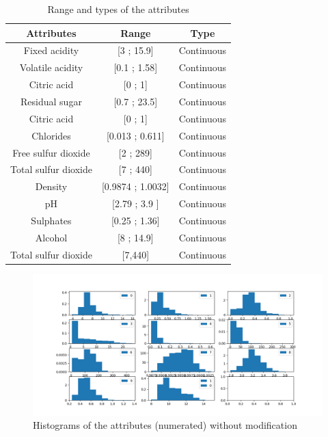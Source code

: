 \documentclass[twoside,a4paper,12pt]{report}
\begin{document}
\begin{table}
\centering
 \begin{tabular}{||c c c||} 
 \hline \hline
 Attributes & Range & Type\\ 
 \hline\hline
 Fixed acidity & [3 ; 15.9] & Continuous\\ 
 \hline
 Volatile acidity & [0.1 ; 1.58] & Continuous\\
 \hline
 Citric acid & [0 ; 1] & Continuous \\
  \hline
 Residual sugar & [0.7 ; 23.5] & Continuous \\
  \hline
 Citric acid & [0 ; 1] & Continuous \\
 \hline
 Chlorides & [0.013 ; 0.611] & Continuous \\
 \hline
 Free sulfur dioxide & [2 ; 289] & Continuous \\
 \hline
 Total sulfur dioxide & [7 ; 440] & Continuous \\
  \hline
 Density & [0.9874 ; 1.0032] & Continuous \\
  \hline
  pH & [2.79 ; 3.9 ] & Continuous \\
   \hline
 Sulphates & [0.25 ; 1.36] & Continuous \\
  \hline
 Alcohol & [8 ; 14.9] & Continuous \\
  \hline
 Total sulfur dioxide & [7,440] & Continuous \\
 \hline \hline
\end{tabular}
\label{RangeAndTypesAttributes}
\caption{Range and types of the attributes}
\end{table}


\begin{figure}
    \centering
    \includegraphics[width=1\textwidth,height=0.7\textheight]{histograms.png}
    \caption{Histograms of the attributes (numerated) without modification}
     \label{HistogramsWithoutMod} 
\end{figure}
\end{document}

